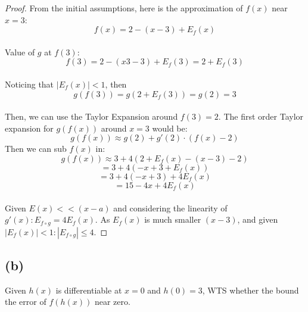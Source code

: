 \documentclass{article}
\begin{document}
\begin{proof}
    From the initial assumptions, here is the approximation of $f(x)$ near $x = 3$: 
    \[f(x) = 2 - (x - 3) + E_f(x)\]
    \\
    Value of $g$ at $f(3)$:
    \[ f(3) = 2 - (x3- 3) + E_f(3) = 2 + E_f(3) \]
    \\
    Noticing that $|E_f(x)| < 1$, then
    \[ g(f(3)) = g(2 + E_f(3)) = g(2) = 3 \]
    \\
    Then, we can use the Taylor Expansion around $f(3) = 2$. 
    The first order Taylor expansion for $g(f(x))$ around $x = 3$ would be:
    \[ g(f(x)) \approx g(2) + g'(2) \cdot (f(x) - 2) \]
    Then we can sub $f(x)$ in:
    \[ g(f(x)) \approx 3 + 4(2 + E_f(x) - (x - 3) - 2) \]
    \[ = 3 + 4(-x + 3 + E_f(x)) \]
    \[ = 3 + 4(-x + 3) + 4E_f(x) \]
    \[ = 15 - 4x + 4E_f(x) \]
    \\
    Given $E(x) << (x - a)$  and considering the linearity of \( g'(x): E_{f \circ g} = 4E_f(x) \).
    As $E_f(x)$ is much smaller $(x - 3)$, and given $|E_f(x)| < 1: |E_{f \circ g}| \leq 4$.
\end{proof}

\subsection*{(b)}
Given $h(x)$ is differentiable at $x = 0$ and $h(0) = 3$, WTS whether the bound the
error of $f(h(x))$ near zero.
\\
\end{document}

